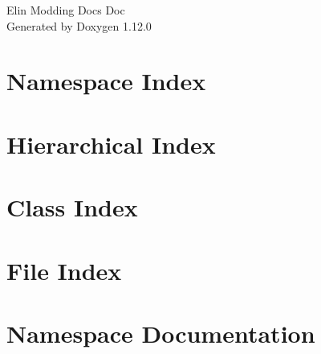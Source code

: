 \documentclass[twoside]{book}
\newcommand{\+}{\discretionary{\mbox{\scriptsize$\hookleftarrow$}}{}{}}
\newcommand{\clearemptydoublepage}{%
    \newpage{\pagestyle{empty}\cleardoublepage}%
  }
\begin{document}
  \raggedbottom
    \hypersetup{pageanchor=false,
                bookmarksnumbered=true,
                pdfencoding=unicode
               }
  \begin{titlepage}
  \vspace*{7cm}
  \begin{center}%
  {\Large Elin Modding Docs Doc}\\
  \vspace*{1cm}
  {\large Generated by Doxygen 1.12.0}\\
  \end{center}
  \end{titlepage}
  \clearemptydoublepage
  \tableofcontents
  \clearemptydoublepage
  \hypersetup{pageanchor=true}
\chapter{Namespace Index}

\chapter{Hierarchical Index}

\chapter{Class Index}

\chapter{File Index}

\chapter{Namespace Documentation}








\end{document}
